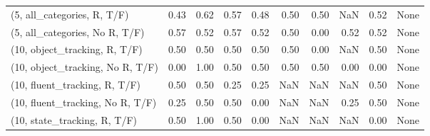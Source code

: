 \begin{table*}[h!]
\begin{adjustbox}{width=2\columnwidth,center}
\begin{tabular}{lrrr|rrr|rrr}
(5, all\_categories, R, T/F)          &                      0.43 &                  0.62 &                      0.57 &                          0.48 &                      0.50 &                          0.50 &                                    NaN &                               0.52 &                                  None \\
(5, all\_categories, No R, T/F)       &                      0.57 &                  0.52 &                      0.57 &                          0.52 &                      0.50 &                          0.00 &                                   0.52 &                               0.52 &                                  None \\



\midrule
(10, object\_tracking, R, T/F)         &                      0.50 &                  0.50 &                      0.50 &                          0.50 &                      0.50 &                          0.00 &                                    NaN &                               0.50 &                                  None \\
(10, object\_tracking, No R, T/F)      &                      0.00 &                  1.00 &                      0.50 &                          0.50 &                      0.50 &                          0.50 &                                   0.00 &                               0.00 &                                  None \\
(10, fluent\_tracking, R, T/F)         &                      0.50 &                  0.50 &                      0.25 &                          0.25 &                       NaN &                           NaN &                                    NaN &                               0.50 &                                  None \\
(10, fluent\_tracking, No R, T/F)      &                      0.25 &                  0.50 &                      0.50 &                          0.00 &                       NaN &                           NaN &                                   0.25 &                               0.50 &                                  None \\
(10, state\_tracking, R, T/F)          &                      0.50 &                  1.00 &                      0.50 &                          0.00 &                       NaN &                           NaN &                                    NaN &                               0.00 &                                  None \\

\end{tabular}
\end{adjustbox}
\end{table*}
